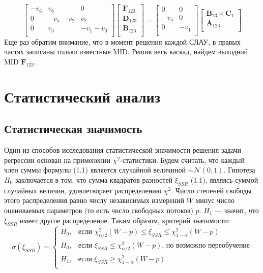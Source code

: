 \documentclass[14pt, a4paper]{extreport}
\begin{document}
$$\begin{bmatrix}
-v_6 & v_6 & 0\\
0 & -v_5-v_2 & v_2\\
0 & v_3 & -v_1-v_3\\
\end{bmatrix}
\begin{bmatrix}
\mathbf{F}_{123}\\
\mathbf{D}_{123}\\
\mathbf{B}_{123}\\
\end{bmatrix}
=
\begin{bmatrix}
0 & 0\\
-v_5 & 0\\
0 & -v_1\\
\end{bmatrix}
\begin{bmatrix}
\mathbf{B}_{23} \times \mathbf{C}_1\\
\mathbf{A}_{123}\\
\end{bmatrix}
$$
Еще раз обратим внимание, что в момент решения каждой СЛАУ, в правых частях записаны только известные MID. Решив весь каскад, найдем выходной MID $\mathbf{F}_{123}$.
\clearpage
\section{Статистический анализ}
\subsection{Статистическая значимость}
Один из способов исследования статистической значимости решения задачи регрессии основан на применении $\chi^2$-статистики\cite{shupltesov_review_2}. Будем считать, что каждый член суммы формулы (1.1) является случайной величиной $\sim \mathcal{N}(0, 1)$. Гипотеза $H_0$ заключается в том, что сумма квадратов разностей $\xi_{SSR}$ (1.1), являясь суммой случайных величин, удовлетворяет распределению $\chi^2$. Число степеней свободы этого распределения равно числу независимых измерений $W$ минус число оцениваемых параметров (то есть число свободных потоков) $p$. $H_1$ --- значит, что $\xi_{SSR}$ имеет другое распределение. Таким образом, критерий значимости:
$$
\sigma(\xi_{SSR}) = \begin{cases}
	H_0,&\text{если $\chi^2_{\alpha / 2}(W - p) \le \xi_{SSR} \le \chi^2_{1 - \alpha}(W - p)$}\\
	H_0,&\text{если $\xi_{SSR} \leq \chi^2_{\alpha / 2}(W - p)$, но возможно переобучение}\\
	H_1,&\text{если $\xi_{SSR} \geq \chi^2_{1 - \alpha}(W - p)$}\\
\end{cases}$$
\end{document}
